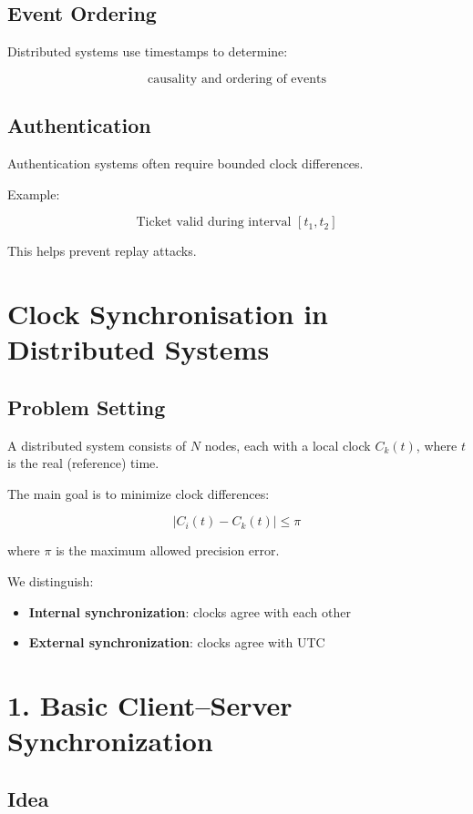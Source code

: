 \subsection{Event Ordering}

Distributed systems use timestamps to determine:

\[
\text{causality and ordering of events}
\]

\subsection{Authentication}

Authentication systems often require bounded clock differences.

Example:

\[
\text{Ticket valid during interval } [t_1,t_2]
\]

This helps prevent replay attacks.


\section{Clock Synchronisation in Distributed Systems}

\subsection{Problem Setting}

A distributed system consists of \(N\) nodes, each with a local clock \(C_k(t)\), where \(t\) is the real (reference) time.

The main goal is to minimize clock differences:

\[
|C_i(t) - C_k(t)| \le \pi
\]

where \(\pi\) is the maximum allowed precision error.

We distinguish:

\begin{itemize}
    \item \textbf{Internal synchronization}: clocks agree with each other
    \item \textbf{External synchronization}: clocks agree with UTC
\end{itemize}



\section{1. Basic Client--Server Synchronization}

\subsection{Idea}

